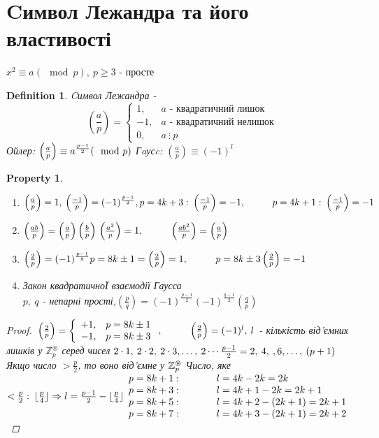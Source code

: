 \documentclass[a4paper,12pt, centered]{bookest}
\newtheorem{definition}{Definition}[section]
\newtheorem*{property*}{Property}
\newcommand\tab[1][1cm]{\hspace*{#1}}
\begin{document}
\section{Cимвол Лежандра та його властивості}
$x^2\equiv a(\mod p),\>p\geq 3$ - просте
\begin{definition}Cимвол Лежандра -
	$$\left(\frac ap\right)=\left\{\begin{array}{ll}
	1, & a\textrm{ - квадратичний лишок}\\
	-1, & a\textrm{ - квадратичний нелишок}	\\
	0, & a\>\vdots\>p
	\end{array}\right.$$
	Ойлер: $\left(\frac ap\right)\equiv a^{\frac{p-1}{2}}(\mod p)\\$
	Гaусc: $\left(\frac ap\right)\equiv (-1)^l$
\end{definition}
\begin{property*}$ $
	\begin{enumerate}
		\item $\left(\frac ap\right)=1,\>\left(\frac {-1}p\right)=(-1)^{\frac{p-1}{2}},\\ p=4k+3:\>\left(\frac {-1}p\right)=-1,\tab p=4k+1:\>\left(\frac {-1}p\right)=-1$
		\item $\left(\frac {ab}p\right)=\left(\frac ap\right)\left(\frac bp\right)\\\left(\frac {a^2}p\right)=1,\tab \left(\frac {ab^2}p\right)=\left(\frac ap\right)$
		\item $\left(\frac 2p\right)=(-1)^{\frac{p-1}{8}}\\p=8k\pm 1=\left(\frac 2p\right)=1,\tab p=8k\pm3\left(\frac 2p\right)=-1$
		\item Закон квадратичноЇ взаємодії Гаусса\\
			$p,\>q$ - непарні прості,\tab $\left(\frac pq\right)=(-1)^{\frac{p-1}{2}}(-1)^{\frac{q-1}{2}}\left(\frac qp\right)$
	\end{enumerate}
	\begin{proof}
		$\\\left(\frac 2p\right)=\left\{\begin{array}{ll}
			+1, & p = 8k\pm1\\
			-1, & p = 8k\pm3
		\end{array}\right.,\tab \left(\frac 2p\right)=(-1)^l,\>l$ - кількість від'ємних лишків у $\mathbb{Z}_p^{\circledast}$ серед чисел $2\cdot1,\>2\cdot2,\>2\cdot3,\dots,\>2\cdots\frac{p-1}{2}=2,\>4,\>,6,\dots,\>(p+1)\\$ Якщо число $>\frac p2$, то воно від'ємне у $\mathbb{Z}_p^{\circledast}\\$ Число, яке $<\frac p2:\>\lfloor\frac p4\rfloor\Rightarrow l=\frac{p-1}{2}-\lfloor\frac p4\rfloor\\\begin{array}{ll}
			p=8k+1:\tab  & l=4k-2k=2k\\
			p=8k+3:\tab  & l=4k+1-2k=2k+1\\
			p=8k+5:\tab  & l=4k+2-(2k+1)=2k+1\\
			p=8k+7:\tab  & l=4k+3-(2k+1)=2k+2
		\end{array}$
	\end{proof}
\end{property*}
\end{document}
